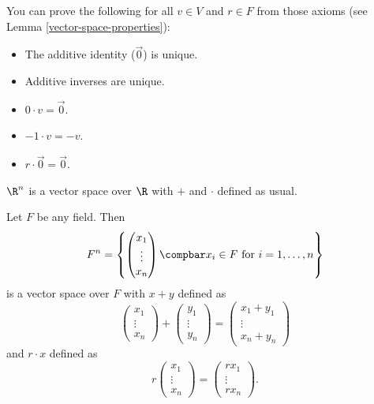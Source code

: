 \documentclass[12pt]{article}
\begin{document}
\begin{rmk}
    You can prove the following for all $v \in V$ and $r \in F$ from those axioms (see Lemma \ref{vector-space-properties}):
    \begin{itemize}
        \item The additive identity ($\vec{0}$) is unique.
        \item Additive inverses are unique.
        \item $0 \cdot v = \vec{0}$.
        \item $-1 \cdot v = -v$.
        \item $r \cdot \vec{0} = \vec{0}$.
    \end{itemize}
\end{rmk}

\begin{exmp}
    $\R^n$ is a vector space over $\R$ with $+$ and $\cdot$ defined as usual.
\end{exmp}

\begin{exmp}
    Let $F$ be any field. Then \[F^n = \left\{\begin{pmatrix}
            x_1 \\ \vdots \\ x_n
        \end{pmatrix} \compbar x_i \in F \textrm{ for } i = 1, \ldots, n \right\}\] is a vector space over $F$ with $x + y$ defined as \[\begin{pmatrix}
            x_1 \\ \vdots \\ x_n
        \end{pmatrix} + \begin{pmatrix}
            y_1 \\ \vdots \\ y_n
        \end{pmatrix} = \begin{pmatrix}
            x_1 + y_1 \\ \vdots \\ x_n + y_n
        \end{pmatrix}\] and $r \cdot x$ defined as \[r\begin{pmatrix}
            x_1 \\ \vdots \\ x_n
        \end{pmatrix} = \begin{pmatrix}
            rx_1 \\ \vdots \\ rx_n
        \end{pmatrix}.\]
\end{exmp}
\end{document}
